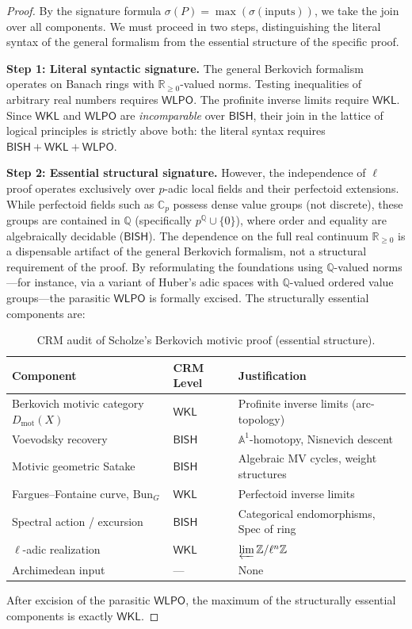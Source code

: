 \documentclass[11pt,a4paper]{article}
\theoremstyle{plain}
\theoremstyle{definition}
\newcommand{\BISH}{\textsf{BISH}}
\newcommand{\WKL}{\textsf{WKL}}
\newcommand{\WLPO}{\textsf{WLPO}}
\newcommand{\Dmot}{D_{\mathrm{mot}}}
\newcommand{\Bun}{\mathrm{Bun}}
\newcommand{\Spec}{\mathrm{Spec}}
\newcommand{\Z}{\mathbb{Z}}
\newcommand{\Q}{\mathbb{Q}}
\newcommand{\R}{\mathbb{R}}
\newcommand{\C}{\mathbb{C}}
\newcommand{\A}{\mathbb{A}}
\newcommand{\sig}{\sigma}
\begin{document}
\begin{proof}
By the signature formula $\sig(P) = \max(\sig(\text{inputs}))$, we take the join over all components. We must proceed in two steps, distinguishing the literal syntax of the general formalism from the essential structure of the specific proof.

\textbf{Step 1: Literal syntactic signature.} The general Berkovich formalism operates on Banach rings with $\R_{\geq 0}$-valued norms. Testing inequalities of arbitrary real numbers requires $\WLPO$. The profinite inverse limits require $\WKL$. Since $\WKL$ and $\WLPO$ are \emph{incomparable} over $\BISH$, their join in the lattice of logical principles is strictly above both: the literal syntax requires $\BISH + \WKL + \WLPO$.

\textbf{Step 2: Essential structural signature.} However, the independence of $\ell$ proof operates exclusively over $p$-adic local fields and their perfectoid extensions. While perfectoid fields such as $\C_p$ possess dense value groups (not discrete), these groups are contained in $\Q$ (specifically $p^{\Q} \cup \{0\}$), where order and equality are algebraically decidable ($\BISH$). The dependence on the full real continuum $\R_{\geq 0}$ is a dispensable artifact of the general Berkovich formalism, not a structural requirement of the proof. By reformulating the foundations using $\Q$-valued norms---for instance, via a variant of Huber's adic spaces with $\Q$-valued ordered value groups---the parasitic $\WLPO$ is formally excised. The structurally essential components are:

\begin{table}[h]
\centering
\begin{tabular}{@{}lll@{}}
\toprule
\textbf{Component} & \textbf{CRM Level} & \textbf{Justification} \\
\midrule
Berkovich motivic category $\Dmot(X)$ & $\WKL$ & Profinite inverse limits (arc-topology) \\
Voevodsky recovery & $\BISH$ & $\A^1$-homotopy, Nisnevich descent \\
Motivic geometric Satake & $\BISH$ & Algebraic MV cycles, weight structures \\
Fargues--Fontaine curve, $\Bun_G$ & $\WKL$ & Perfectoid inverse limits \\
Spectral action / excursion & $\BISH$ & Categorical endomorphisms, $\Spec$ of ring \\
$\ell$-adic realization & $\WKL$ & $\varprojlim \Z/\ell^n\Z$ \\
Archimedean input & --- & None \\
\bottomrule
\end{tabular}
\caption{CRM audit of Scholze's Berkovich motivic proof (essential structure).}
\label{tab:audit}
\end{table}

After excision of the parasitic $\WLPO$, the maximum of the structurally essential components is exactly $\WKL$.
\end{proof}
\end{document}
